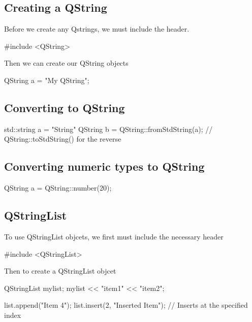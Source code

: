\documentclass{report}
\begin{document}
    \subsection{Creating a QString}
    \bigbreak \noindent 
    Before we create any Qstrings, we must include the header.
    \bigbreak \noindent 
    \begin{cppcode}
#include <QString>
    \end{cppcode}
    \bigbreak \noindent 
    Then we can create our QString objects
    \bigbreak \noindent 
    \begin{cppcode}
    QString a = "My QString";
    \end{cppcode}
    \bigbreak \noindent 
    \subsection{Converting to QString}
    \bigbreak \noindent 
    \begin{cppcode}
std::string a = "String"
QString b = QString::fromStdString(a); // QString::toStdString() for the reverse
    \end{cppcode}

    \pagebreak
    \subsection{Converting numeric types to QString}
    \bigbreak \noindent 
    \begin{cppcode}
    QString a = QString::number(20);
    \end{cppcode}

    \bigbreak \noindent 
    \subsection{QStringList}
    \bigbreak \noindent 
    To use QStringList objcets, we first must include the necessary header
    \bigbreak \noindent 
    \begin{cppcode}
    #include <QStringList>
    \end{cppcode}
    \bigbreak \noindent 
    Then to create a QStringList objcet
    \bigbreak \noindent 
    \begin{cppcode}
    QStringList mylist;
    mylist << "item1" << "item2";

    list.append("Item 4");
    list.insert(2, "Inserted Item");  // Inserts at the specified index
    \end{cppcode}
    \bigbreak \noindent 
\end{document}
